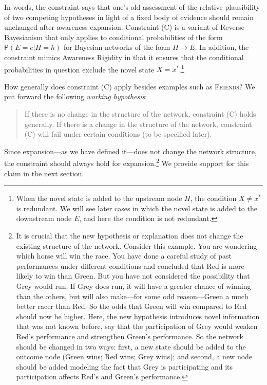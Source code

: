 \documentclass[
  11pt,
  dvipsnames,enabledeprecatedfontcommands, todos]{scrartcl}
\newcommand{\pr}[1]{\ensuremath{\mathsf{P}(#1)}}
\begin{document}
In words, the constraint says that one's old assessment of the relative
plausibility of two competing hypotheses in light of a fixed body of
evidence should remain unchanged after awareness expansion. Constraint
(C) is a variant of Reverse Bayesianism that only applies to conditional
probabilities of the form \(\pr{E=e \vert H=h}\) for Bayesian networks
of the form \(H \rightarrow E\). In addition, the constraint mimics
Awareness Rigidity in that it ensures that the conditional probabilities
in question exclude the novel state \(X=x^*\).\footnote{When the novel
  state is added to the upstream node \(H\), the condition \(X\neq x^*\)
  is redundant. We will see later cases in which the novel state is
  added to the downstream node \(E\), and here the condition is not
  redundant.}

How generally does constraint (C) apply besides examples such as
\textsc{Friends}? We put forward the following \emph{working
hypothesis}:

\begin{quote}
If there is no change in the structure of the network, constraint (C)
holds generally. If there is a change in the structure of the network,
constraint (C) will fail under certain conditions (to be specified
later).
\end{quote}

\noindent Since expansion---as we have defined it---does not change the
network structure, the constraint should always hold for
expansion.\footnote{It is crucial that the new hypothesis or explanation
  does not change the existing structure of the network. Consider this
  example. You are wondering which horse will win the race. You have
  done a careful study of past performances under different conditions
  and concluded that Red is more likely to win than Green. But you have
  not considered the possibility that Grey would run. If Grey does run,
  it will have a greater chance of winning than the others, but will
  also make---for some odd reason---Green a much better racer than Red.
  So the odds that Green will win compared to Red should now be higher.
  Here, the new hypothesis introduces novel information that was not
  known before, say that the participation of Grey would weaken Red's
  performance and strengthen Green's performance. So the network should
  be changed in two ways: first, a new state should be added to the
  outcome node (Green wins; Red wins; Grey wins); and second, a new node
  should be added modeling the fact that Grey is participating and its
  participation affects Red's and Green's performance.} We provide
support for this claim in the next section.
\end{document}
